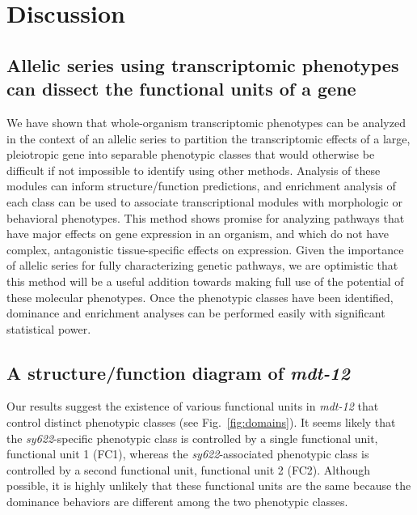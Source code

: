 \documentclass[10pt, twocolumn]{article}
\newcommand{\cel}{\emph{C.~elegans}}
\newcommand{\gene}[1]{\mbox{\emph{#1}}}
\newcommand{\protein}[1]{\mbox{\uppercase{#1}}}
\newcommand{\dpy}{\gene{mdt-12}}
\begin{document}
\section*{Discussion}
\label{sec:conclusions}
\subsection*{Allelic series using transcriptomic phenotypes can dissect the
             functional units of a gene}
We have shown that whole-organism transcriptomic phenotypes can be analyzed in
the context of an allelic series to partition the transcriptomic effects of a
large, pleiotropic gene into separable phenotypic classes that would otherwise
be difficult if not impossible to identify using other methods. Analysis of
these modules can inform structure/function predictions, and enrichment analysis
of each class can be used to associate transcriptional modules with morphologic
or behavioral phenotypes. This method shows promise for analyzing pathways that
have major effects on gene expression in an organism, and which do not have
complex, antagonistic tissue-specific effects on expression. Given the
importance of allelic series for fully characterizing genetic pathways, we are
optimistic that this method will be a useful addition towards making full use of
the potential of these molecular phenotypes. Once the phenotypic classes have
been identified, dominance and enrichment analyses can be performed easily with
significant statistical power.

\subsection*{A structure/function diagram of \dpy{}}
Our results suggest the existence of various functional units in \dpy{}
that control distinct phenotypic classes (see Fig.~\ref{fig:domains}). It seems
likely that the \emph{sy622}-specific phenotypic class is controlled by a single
functional unit, functional unit 1 (FC1), whereas the \emph{sy622}-associated
phenotypic class is controlled by a second functional unit, functional unit 2
(FC2). Although possible, it is highly unlikely that these functional units are
the same because the dominance behaviors are different among the two phenotypic
classes.
\end{document}
